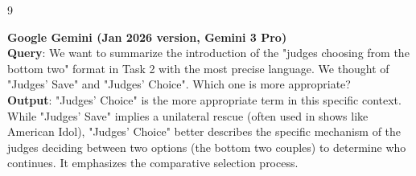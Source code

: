\begin{ReportAiUse}{9}

\textbf{Google Gemini (Jan 2026 version, Gemini 3 Pro)}\\
\textbf{Query}: We want to summarize the introduction of the "judges choosing from the bottom two" format in Task 2 with the most precise language. We thought of "Judges' Save" and "Judges' Choice". Which one is more appropriate?\\
\textbf{Output}: "Judges' Choice" is the more appropriate term in this specific context. While "Judges' Save" implies a unilateral rescue (often used in shows like American Idol), "Judges' Choice" better describes the specific mechanism of the judges deciding between two options (the bottom two couples) to determine who continues. It emphasizes the comparative selection process.

\end{ReportAiUse}